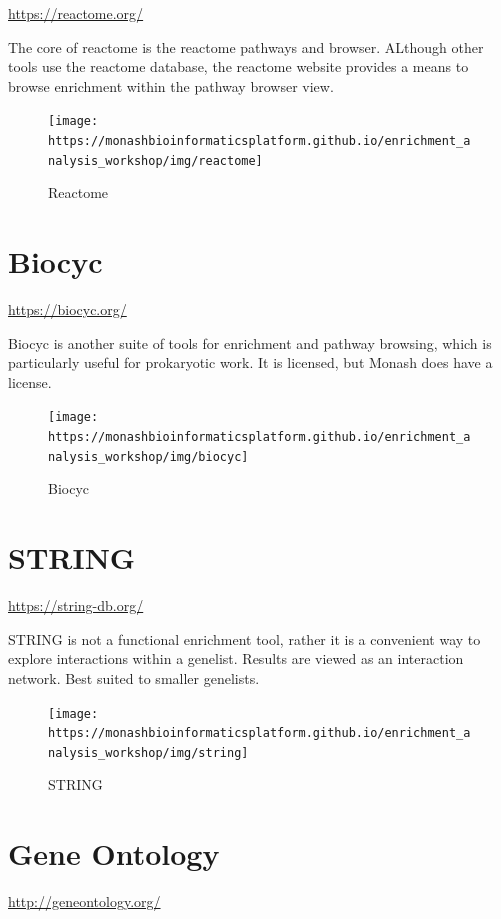 \documentclass[
]{book}
\begin{document}
\url{https://reactome.org/}

The core of reactome is the reactome pathways and browser. ALthough other tools use the reactome database, the reactome website provides a means to browse enrichment within the pathway browser view.

\begin{figure}
\texttt{[image: https://monashbioinformaticsplatform.github.io/enrichment\_analysis\_workshop/img/reactome]} \caption{Reactome}\label{fig:unnamed-chunk-41}
\end{figure}

\hypertarget{biocyc}{%
\section{Biocyc}\label{biocyc}}

\url{https://biocyc.org/}

Biocyc is another suite of tools for enrichment and pathway browsing, which is particularly useful for prokaryotic work. It is licensed, but Monash does have a license.

\begin{figure}
\texttt{[image: https://monashbioinformaticsplatform.github.io/enrichment\_analysis\_workshop/img/biocyc]} \caption{Biocyc}\label{fig:unnamed-chunk-42}
\end{figure}

\hypertarget{string}{%
\section{STRING}\label{string}}

\url{https://string-db.org/}

STRING is not a functional enrichment tool, rather it is a convenient way to explore interactions within a genelist. Results are viewed as an interaction network. Best suited to smaller genelists.

\begin{figure}
\texttt{[image: https://monashbioinformaticsplatform.github.io/enrichment\_analysis\_workshop/img/string]} \caption{STRING}\label{fig:unnamed-chunk-43}
\end{figure}

\hypertarget{gene-ontology}{%
\section{Gene Ontology}\label{gene-ontology}}

\url{http://geneontology.org/}
\end{document}
